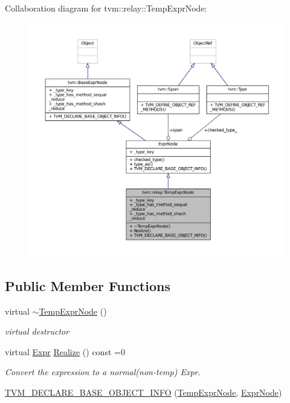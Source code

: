 Collaboration diagram for tvm\+:\+:relay\+:\+:Temp\+Expr\+Node\+:
\nopagebreak
\begin{figure}[H]
\begin{center}
\leavevmode
\includegraphics[width=350pt]{classtvm_1_1relay_1_1TempExprNode__coll__graph}
\end{center}
\end{figure}
\subsection*{Public Member Functions}
\begin{DoxyCompactItemize}
\item 
virtual \hyperlink{classtvm_1_1relay_1_1TempExprNode_a63fb3788b46327cc15f1cf80bad126ad}{$\sim$\+Temp\+Expr\+Node} ()
\begin{DoxyCompactList}\small\item\em virtual destructor \end{DoxyCompactList}\item 
virtual \hyperlink{namespacetvm_1_1relay_a5b84e3790f89bb3fad5c7911eeb99531}{Expr} \hyperlink{classtvm_1_1relay_1_1TempExprNode_a96ae81e7b4eac7ff967ff14b43aaba87}{Realize} () const =0
\begin{DoxyCompactList}\small\item\em Convert the expression to a normal(non-\/temp) Expr. \end{DoxyCompactList}\item 
\hyperlink{classtvm_1_1relay_1_1TempExprNode_a96299d26d32ecba0f0975ed531d8ee4b}{T\+V\+M\+\_\+\+D\+E\+C\+L\+A\+R\+E\+\_\+\+B\+A\+S\+E\+\_\+\+O\+B\+J\+E\+C\+T\+\_\+\+I\+N\+FO} (\hyperlink{classtvm_1_1relay_1_1TempExprNode}{Temp\+Expr\+Node}, \hyperlink{namespacetvm_1_1relay_a387f18e050d016c52ea6c4781e7cff6c}{Expr\+Node})
\end{DoxyCompactItemize}
